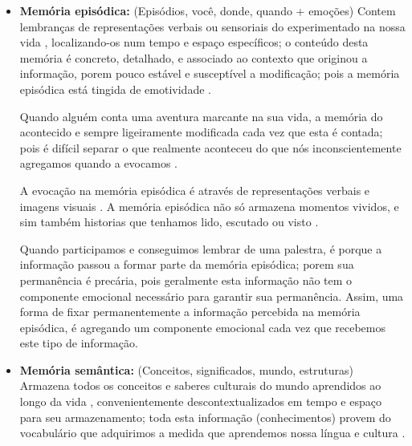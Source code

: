 \begin{itemize}
\item \textbf{Memória episódica:}  (Episódios, você, donde, quando + emoções)
\label{posref:memoriaepisodica}
Contem lembranças de representações verbais ou sensoriais do experimentado na nossa vida \cite[pp. 138]{pake2019psicologia} \cite[pp. 34-35]{de2000comprension}, 
localizando-os num tempo e espaço específicos;
o conteúdo desta memória é concreto, detalhado, e associado ao contexto que originou a informação,
porem pouco estável e susceptível a modificação; 
pois a memória episódica está tingida de emotividade
\cite[pp. 34-35]{de2000comprension}.
\begin{example}
Quando alguém conta uma aventura marcante na sua vida,
a memória do acontecido e sempre ligeiramente modificada cada vez que esta é contada;
pois é difícil separar o que realmente aconteceu do que nós inconscientemente agregamos quando a evocamos
\cite[pp. 35]{de2000comprension}.
\end{example}
A  evocação na memória episódica é através de representações verbais e imagens visuais
\cite[pp. 35]{de2000comprension}.
A memória episódica não só armazena momentos vividos, 
e sim também historias que tenhamos lido, escutado ou visto
\cite[pp. 35]{de2000comprension}.
\begin{example}
Quando participamos e conseguimos lembrar de uma palestra, 
é porque a informação passou a formar parte da memória episódica;
porem sua permanência é precária, 
pois geralmente esta  informação não tem o componente emocional necessário para garantir sua permanência.
Assim, uma forma de fixar permanentemente a informação percebida na memória episódica,
é agregando um componente emocional cada vez que recebemos este tipo de informação.
\end{example}
\item \textbf{Memória semântica:} (Conceitos, significados, mundo, estruturas)
\label{posref:memoriasemantica}
Armazena todos os conceitos e saberes culturais do mundo aprendidos ao longo da vida 
\cite[pp. 139]{pake2019psicologia} \cite[pp. 34]{de2000comprension},
convenientemente descontextualizados em tempo e espaço para seu armazenamento;
toda esta informação (conhecimentos) provem do vocabulário que adquirimos a medida que aprendemos nossa língua e cultura
\cite[pp. 34]{de2000comprension}.

\end{itemize}

